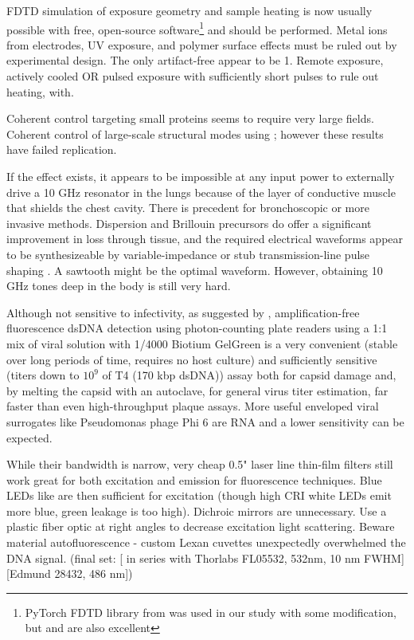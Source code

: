 \documentclass[paper.tex]{subfiles}
\begin{document}
FDTD simulation of exposure geometry and sample heating is now usually possible with free, open-source software\footnote{PyTorch FDTD library from \cite{Highly2019} was used in our study with some modification, but \cite{CUDAbased2019} and \cite{openEMS} are also excellent} and should be performed. Metal ions from electrodes, UV exposure, and polymer surface effects must be ruled out by experimental design. The only artifact-free appear to be 1. Remote exposure, actively cooled OR pulsed exposure with sufficiently short pulses to rule out heating, with. 

Coherent control targeting small proteins seems to require very large fields. Coherent control of large-scale structural modes using ; however these results have failed replication.

If the effect exists, it appears to be impossible at any input power to externally drive a 10 GHz resonator in the lungs because of the layer of conductive muscle that shields the chest cavity. There is precedent for bronchoscopic \cite{Flexible2019}\cite{Antenna2018} or more invasive methods. Dispersion and Brillouin precursors do offer a significant improvement in loss through tissue, and the required electrical waveforms appear to be synthesizeable by variable-impedance or stub transmission-line pulse shaping\cite{Arbitrarya} . A sawtooth might be the optimal waveform. However, obtaining 10 GHz tones deep in the body is still very hard.

Although not sensitive to infectivity, as suggested by \cite{Quantification2020}, amplification-free fluorescence dsDNA detection using photon-counting plate readers using a 1:1 mix of viral solution with 1/4000 Biotium GelGreen is a very convenient (stable over long periods of time, requires no host culture) and sufficiently sensitive (titers down to $10^9$ of T4 (170 kbp dsDNA)) assay both for capsid damage and, by melting the capsid with an autoclave, for general virus titer estimation, far faster than even high-throughput plaque assays. More useful enveloped viral surrogates like Pseudomonas phage Phi 6 are RNA and a lower sensitivity can be expected.

While their bandwidth is narrow, very cheap 0.5" laser line thin-film filters still work great for both excitation and emission for fluorescence techniques. Blue LEDs like are then sufficient for excitation (though high CRI white LEDs emit more blue, green leakage is too high). Dichroic mirrors are unnecessary. Use a plastic fiber optic at right angles to decrease excitation light scattering. Beware material autofluorescence - custom Lexan cuvettes unexpectedly overwhelmed the DNA signal. (final set: [ in series with Thorlabs FL05532, 532nm, 10 nm FWHM] [Edmund 28432, 486 nm])
\end{document}
